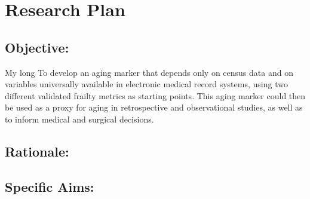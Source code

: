 \section{Research Plan }\label{research-plan}


\subsection{Objective:}\label{objective}
  

My long
To develop an aging marker\cite{Orkaby_2017} that depends only on census data and on
variables universally available in electronic medical record systems,
using two different validated frailty metrics as starting points. This
aging marker could then be used as a proxy for aging in retrospective
and observational studies, as well as to inform medical and surgical
decisions.


\subsection{Rationale:}\label{rationale}

\subsection{Specific Aims:}\label{specific-aims}
